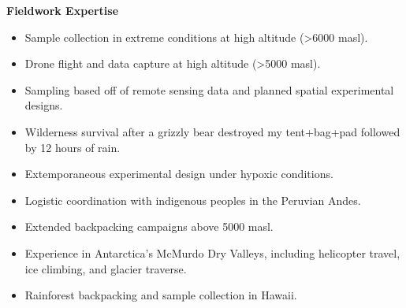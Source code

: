 \documentclass{article}
\begin{document}
\vspace{3mm}
{\large  \textbf{Fieldwork Expertise}}
\begin{itemize}[noitemsep,topsep=0pt, leftmargin=5mm]
  \item Sample collection in extreme conditions at high altitude (\textgreater6000 masl).
  \item Drone flight and data capture at high altitude (\textgreater5000 masl).
  \item Sampling based off of remote sensing data and planned spatial experimental designs.
  \item Wilderness survival after a grizzly bear destroyed my tent+bag+pad followed by 12 hours of rain.
  \item Extemporaneous experimental design under hypoxic conditions.
  \item Logistic coordination with indigenous peoples in the Peruvian Andes.
  \item Extended backpacking campaigns above 5000 masl.
  \item Experience in Antarctica’s McMurdo Dry Valleys, including helicopter travel, ice climbing, and glacier traverse.
  \item Rainforest backpacking and sample collection in Hawaii.

\end{itemize}
\end{document}
